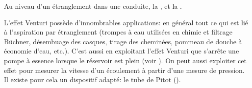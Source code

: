 \documentclass[12pt,fancy]{cours}
\begin{document}
\begin{prop}\label{prop:}
  Au niveau d'un étranglement dans une conduite, la , et la .
\end{prop}




%

L'effet Venturi possède d'innombrables applications: en général tout ce qui est lié à l'aspiration par étranglement (trompes à eau utilisées en chimie et filtrage Büchner, désembuage des casques, tirage des cheminées, pommeau de douche à économie d'eau, etc.). C'est aussi en exploitant l'effet Venturi que s'arrête une pompe à essence lorsque le réservoir est plein (voir \href{https://youtu.be/jUdlNsgjJRY}{}).
On peut aussi exploiter cet effet pour mesurer la vitesse d'un écoulement à partir d'une mesure de pression. Il existe pour cela un dispositif adapté: le tube de Pitot ().
\end{document}
